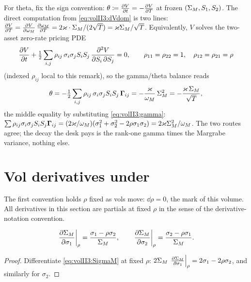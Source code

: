 \begin{remark}
For theta, fix the sign convention: $\theta \coloneqq \frac{\partial V}{\partial t} = -\frac{\partial V}{\partial T}$
at frozen $(\Sigma_M, S_1, S_2)$. The direct computation from
\eqref{eq:volII3:dVdom} is two lines: $\frac{\partial V}{\partial T} = \frac{\partial V}{\partial \omega_M}\,\frac{\partial \omega_M}{\partial T}
= 2\varkappa \cdot \Sigma_M/(2\sqrt{T}) = \varkappa\Sigma_M/\sqrt{T}$. Equivalently, $V$
solves the two-asset zero-rate pricing PDE
\begin{equation}\label{eq:volII3:pde}
\frac{\partial V}{\partial t} + \tfrac12 \sum_{i,j} \rho_{ij}\,\sigma_i\sigma_j S_i S_j\,
\frac{\partial^2 V}{\partial S_i\,\partial S_j} = 0,
\qquad \rho_{11} = \rho_{22} = 1, \quad \rho_{12} = \rho_{21} = \rho
\end{equation}
(indexed $\rho_{ij}$ local to this remark), so the gamma/theta balance reads
\begin{equation}\label{eq:volII3:theta}
\theta = -\tfrac12 \sum_{i,j} \rho_{ij}\,\sigma_i\sigma_j S_i S_j\,
\mathbf{\Gamma}_{ij}
       = -\frac{\varkappa}{\omega_M}\,\Sigma_M^2 = -\frac{\varkappa\,\Sigma_M}{\sqrt{T}},
\end{equation}
the middle equality by substituting \eqref{eq:volII3:gamma}:
$\sum \rho_{ij}\sigma_i\sigma_j S_iS_j \mathbf{\Gamma}_{ij}
= (2\varkappa/\omega_M)(\sigma_1^2 + \sigma_2^2 - 2\rho\sigma_1\sigma_2)
= 2\varkappa\Sigma_M^2/\omega_M$. The two routes agree; the decay the desk pays
is the rank-one gamma times the Margrabe variance, nothing else.
\end{remark}

\section{Vol derivatives under \stickyrho}
\label{sec:volII3:stickyrho}

The first convention holds $\rho$ fixed as vols move: $\dd\rho = 0$, the
\stickyrho{} mark of this volume. All derivatives in this section are partials
at fixed $\rho$ in the sense of the derivative-notation convention.

\begin{proposition}
\label{prop:volII3:dSMrho}
\begin{equation}\label{eq:volII3:dSMrho}
\left.\frac{\partial \Sigma_M}{\partial \sigma_1}\right|_{\rho} = \frac{\sigma_1 - \rho\sigma_2}{\Sigma_M},
\qquad
\left.\frac{\partial \Sigma_M}{\partial \sigma_2}\right|_{\rho} = \frac{\sigma_2 - \rho\sigma_1}{\Sigma_M}.
\end{equation}
\end{proposition}

\begin{proof}
Differentiate \eqref{eq:volII3:SigmaM} at fixed $\rho$:
$2\Sigma_M\,\left.\frac{\partial \Sigma_M}{\partial \sigma_1}\right|_{\rho} = 2\sigma_1 - 2\rho\sigma_2$,
and similarly for $\sigma_2$.
\end{proof}

